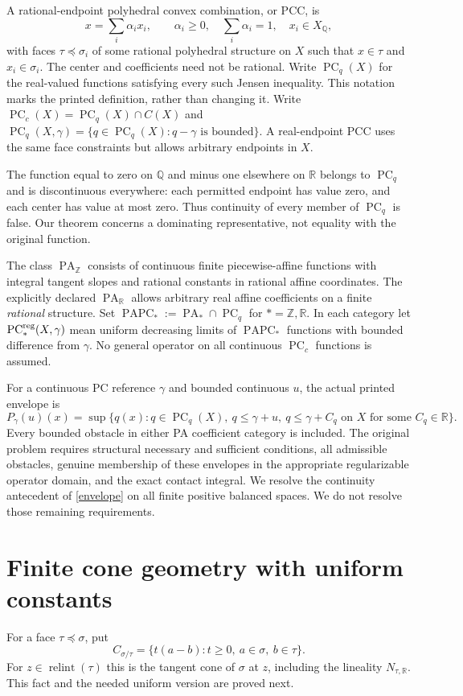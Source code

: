 \documentclass[11pt]{article}
\newcommand{\R}{\mathbb R}
\newcommand{\Q}{\mathbb Q}
\newcommand{\Z}{\mathbb Z}
\newcommand{\PC}{\operatorname{PC}}
\newcommand{\PA}{\operatorname{PA}}
\newcommand{\PAPC}{\operatorname{PAPC}}
\newcommand{\relint}{\operatorname{relint}}
\begin{document}
A rational-endpoint polyhedral convex combination, or PCC, is
\[x=\sum_i\alpha_i x_i,\qquad \alpha_i\geq0,\quad\sum_i\alpha_i=1,\quad x_i\in X_\Q,
\]
with faces $\tau\preceq\sigma_i$ of some rational polyhedral structure on $X$ such that $x\in\tau$ and $x_i\in\sigma_i$. The center and coefficients need not be rational. Write $\PC_q(X)$ for the real-valued functions satisfying every such Jensen inequality. This notation marks the printed definition, rather than changing it. Write $\PC_c(X)=\PC_q(X)\cap C(X)$ and $\PC_q(X,\gamma)=\{q\in\PC_q(X):q-\gamma\text{ is bounded}\}$. A real-endpoint PCC uses the same face constraints but allows arbitrary endpoints in $X$.

The function equal to zero on $\Q$ and minus one elsewhere on $\R$ belongs to $\PC_q$ and is discontinuous everywhere: each permitted endpoint has value zero, and each center has value at most zero. Thus continuity of every member of $\PC_q$ is false. Our theorem concerns a dominating representative, not equality with the original function.

The class $\PA_\Z$ consists of continuous finite piecewise-affine functions with integral tangent slopes and rational constants in rational affine coordinates. The explicitly declared $\PA_\R$ allows arbitrary real affine coefficients on a finite \emph{rational} structure. Set $\PAPC_*:=\PA_*\cap\PC_q$ for $*=\Z,\R$. In each category let $\PC^{\rm reg}_*(X,\gamma)$ mean uniform decreasing limits of $\PAPC_*$ functions with bounded difference from $\gamma$. No general operator on all continuous $\PC_c$ functions is assumed.

For a continuous PC reference $\gamma$ and bounded continuous $u$, the actual printed envelope is
\begin{equation}\label{envelope}
 P_\gamma(u)(x)=\sup\{q(x):q\in\PC_q(X),\ q\leq\gamma+u,\ q\leq\gamma+C_q\text{ on }X\text{ for some }C_q\in\R\}.
\end{equation}
Every bounded obstacle in either PA coefficient category is included. The original problem requires structural necessary and sufficient conditions, all admissible obstacles, genuine membership of these envelopes in the appropriate regularizable operator domain, and the exact contact integral. We resolve the continuity antecedent of \eqref{envelope} on all finite positive balanced spaces. We do not resolve those remaining requirements.

\section{Finite cone geometry with uniform constants}
For a face $\tau\preceq\sigma$, put
\[C_{\sigma/\tau}=\{t(a-b):t\geq0,\ a\in\sigma,\ b\in\tau\}.
\]
For $z\in\relint(\tau)$ this is the tangent cone of $\sigma$ at $z$, including the lineality $N_{\tau,\R}$. This fact and the needed uniform version are proved next.
\end{document}
